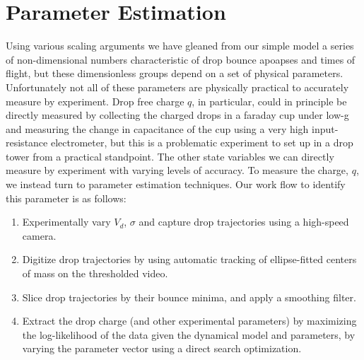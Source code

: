 \documentclass[12pt,a4paper,oneside]{book}
\begin{document}
\section{Parameter Estimation}
Using various scaling arguments we have gleaned from our simple model a series of non-dimensional numbers characteristic of drop bounce apoapses and times of flight, but these dimensionless groups depend on a set of physical parameters. Unfortunately not all of these parameters are physically practical to accurately measure by experiment. Drop free charge $q$, in particular, could in principle be directly measured by collecting the charged drops in a faraday cup under low-g and measuring the change in capacitance of the cup using a very high input-resistance electrometer, but this is a problematic experiment to set up in a drop tower from a practical standpoint. The other state variables we can directly measure by experiment with varying levels of accuracy. To measure the charge, $q$, we instead turn to parameter estimation techniques. Our work flow to identify this parameter is as follows:
\begin{enumerate}
\item Experimentally vary $V_d$, $\sigma$ and capture drop trajectories using a high-speed camera.
\item Digitize drop trajectories by using automatic tracking of ellipse-fitted centers of mass on the thresholded video.
\item Slice drop trajectories by their bounce minima, and apply a smoothing filter.
\item Extract the drop charge (and other experimental parameters) by maximizing the log-likelihood of the data given the dynamical model and parameters, by varying the parameter vector using a direct search optimization. 
\end{enumerate}
\end{document}
